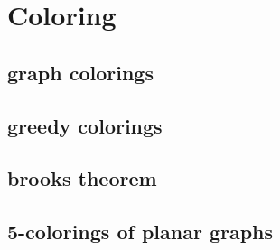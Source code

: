 \documentclass[main]{subfiles}
\begin{document}

\section{Coloring}
\subsection{graph colorings}
\subsection{greedy colorings}
\subsection{brooks theorem}
\subsection{5-colorings of planar graphs}
\end{document}
